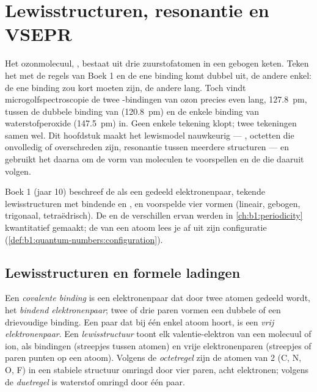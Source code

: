 \chapter{Lewisstructuren, resonantie en VSEPR}\label{ch:b1:lewis-resonance-vsepr}

Het ozonmolecuul, , bestaat uit drie zuurstofatomen in een
gebogen keten. Teken het met de regels van Boek 1 en de ene binding komt
dubbel uit, de andere enkel: de ene binding zou kort moeten zijn, de
andere lang. Toch vindt microgolfspectroscopie de twee -bindingen
van ozon precies even lang, \qty{127.8}{pm}, tussen de dubbele binding
van  (\qty{120.8}{pm}) en de enkele binding van waterstofperoxide
(\qty{147.5}{pm}) in. Geen enkele tekening klopt; twee tekeningen samen
wel. Dit hoofdstuk maakt het lewismodel nauwkeurig --- ,
octetten die onvolledig of overschreden zijn, resonantie tussen meerdere
structuren --- en gebruikt het daarna om de vorm van moleculen te
voorspellen en de  die daaruit volgen.


\begin{recall}
Boek 1 (jaar 10) beschreef de  als een gedeeld
elektronenpaar, tekende lewisstructuren met bindende en , en voorspelde vier vormen (lineair, gebogen, trigonaal,
tetraëdrisch). De  en de verschillen ervan werden in
\cref{ch:b1:periodicity} kwantitatief gemaakt; de  van
een atoom lees je af uit zijn configuratie
(\cref{def:b1:quantum-numbers:configuration}).
\end{recall}

\section{Lewisstructuren en formele ladingen}

\begin{definition}\label{def:b1:lewis-resonance-vsepr:lewis}
Een \emph{covalente binding} is een
elektronenpaar dat door twee atomen gedeeld wordt, het \emph{bindend
elektronenpaar}; twee of drie paren vormen
een dubbele of een drievoudige binding. Een paar  dat
bij één enkel atoom hoort, is een \emph{vrij
elektronenpaar}. Een
\emph{lewisstructuur} toont elk
valentie-elektron van een molecuul of ion, als bindingen (streepjes
tussen atomen) en vrije elektronenparen (streepjes of paren punten op een
atoom). Volgens de \emph{octetregel} zijn de atomen van
 2 (C, N, O, F) in een stabiele structuur omringd door vier paren,
acht elektronen; volgens de \emph{duetregel} is
waterstof omringd door één paar.
\end{definition}

